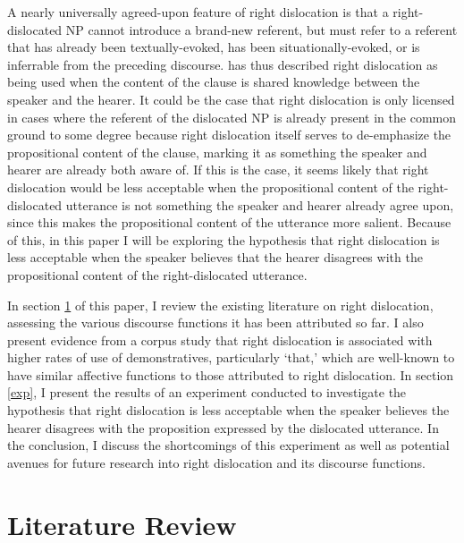 \documentclass[titlepage,12pt]{article}
\begin{document}
A nearly universally agreed-upon feature of right dislocation is that a right-dislocated NP cannot introduce a brand-new referent, but must refer to a referent that has already been textually-evoked, has been situationally-evoked, or is inferrable from the preceding discourse.
\citet{aijmer_themes_1989} has thus described right dislocation as being used when the content of the clause is shared knowledge between the speaker and the hearer.
It could be the case that right dislocation is only licensed in cases where the referent of the dislocated NP is already present in the common ground to some degree because right dislocation itself serves to de-emphasize the propositional content of the clause, marking it as something the speaker and hearer are already both aware of. If this is the case, it seems likely that right dislocation would be less acceptable when the propositional content of the right-dislocated utterance is not something the speaker and hearer already agree upon, since this makes the propositional content of the utterance more salient. Because of this, in this paper I will be exploring the hypothesis that right dislocation is less acceptable when the speaker believes that the hearer disagrees with the propositional content of the right-dislocated utterance.

In section \ref{lit} of this paper, I review the existing literature on right dislocation, assessing the various discourse functions it has been attributed so far. I also present evidence from a corpus study that right dislocation is associated with higher rates of use of demonstratives, particularly `that,' which are well-known to have similar affective functions to those attributed to right dislocation. In section \ref{exp}, I present the results of an experiment conducted to investigate the hypothesis that right dislocation is less acceptable when the speaker believes the hearer disagrees with the proposition expressed by the dislocated utterance. In the conclusion, I discuss the shortcomings of this experiment as well as potential avenues for future research into right dislocation and its discourse functions.

\section{Literature Review} \label{lit}
\end{document}
